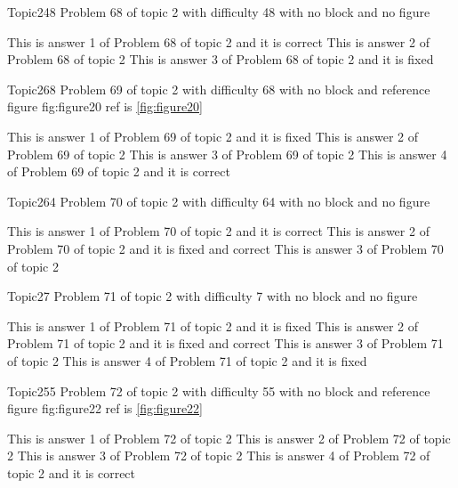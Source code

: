 \documentclass[master]{exam}
\begin{document}
\begin{problem}{Topic2}{48}
	Problem 68 of topic 2 with difficulty 48 with no block and no figure
	\begin{answers}
		\answer[correct] This is answer 1 of Problem 68 of topic 2 and it is correct
		\answer This is answer 2 of Problem 68 of topic 2 
		\answer[fixed] This is answer 3 of Problem 68 of topic 2 and it is fixed
	\end{answers}
\end{problem}

\begin{problem}{Topic2}{68}
	Problem 69 of topic 2 with difficulty 68 with no block and reference figure fig:figure20 ref is \ref{fig:figure20}
	\begin{answers}
		\answer[fixed] This is answer 1 of Problem 69 of topic 2 and it is fixed
		\answer This is answer 2 of Problem 69 of topic 2 
		\answer This is answer 3 of Problem 69 of topic 2 
		\answer[correct] This is answer 4 of Problem 69 of topic 2 and it is correct
	\end{answers}
\end{problem}

\begin{problem}{Topic2}{64}
	Problem 70 of topic 2 with difficulty 64 with no block and no figure
	\begin{answers}
		\answer[correct] This is answer 1 of Problem 70 of topic 2 and it is correct
		 This is answer 2 of Problem 70 of topic 2 and it is fixed and correct
		\answer This is answer 3 of Problem 70 of topic 2 
	\end{answers}
\end{problem}

\begin{problem}{Topic2}{7}
	Problem 71 of topic 2 with difficulty 7 with no block and no figure
	\begin{answers}
		\answer[fixed] This is answer 1 of Problem 71 of topic 2 and it is fixed
		 This is answer 2 of Problem 71 of topic 2 and it is fixed and correct
		\answer This is answer 3 of Problem 71 of topic 2 
		\answer[fixed] This is answer 4 of Problem 71 of topic 2 and it is fixed
	\end{answers}
\end{problem}

\begin{problem}{Topic2}{55}
	Problem 72 of topic 2 with difficulty 55 with no block and reference figure fig:figure22 ref is \ref{fig:figure22}
	\begin{answers}
		\answer This is answer 1 of Problem 72 of topic 2 
		\answer This is answer 2 of Problem 72 of topic 2 
		\answer This is answer 3 of Problem 72 of topic 2 
		\answer[correct] This is answer 4 of Problem 72 of topic 2 and it is correct
	\end{answers}
\end{problem}
\end{document}
